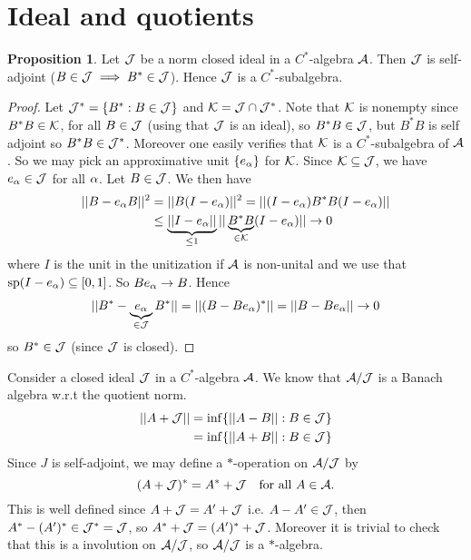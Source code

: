 \documentclass[10pt,english,a4paper]{article}
\theoremstyle{definition}
\newtheorem*{proposition}{Proposition}
\DeclareMathOperator{\Sp}{sp}
\begin{document}
\section{Ideal and quotients}
\begin{proposition}
    Let $\mathcal{J}$ be a norm closed ideal in a $C^*$-algebra $\mathcal{A}$. Then $\mathcal{J}$ is self-adjoint ($B \in \mathcal{J} \implies B^* \in \mathcal{J}$). 
Hence $\mathcal{J}$ is a $C^*$-subalgebra. 
\end{proposition}
\begin{proof}
    Let $\mathcal{J}^* = \{B^* : B \in \mathcal{J}\}$ and $\mathcal{K} = \mathcal{J}\cap \mathcal{J}^*$. Note that 
    $\mathcal{K}$ is nonempty since $B^*B \in \mathcal{K}$, for all $B\in \mathcal{J}$ (using that $\mathcal{J}$ is an ideal),
so $B^*B \in \mathcal{J}$, but $B^*B$ is self adjoint so $B^*B \in \mathcal{J}^*$.
Moreover one easily verifies that $\mathcal{K}$ is a $C^*$-subalgebra of $\mathcal{A}$.
So we may pick an approximative unit $\{e_{\alpha}\}$ for $\mathcal{K}$. Since 
$\mathcal{K} \subseteq \mathcal{J}$, we have $e_{\alpha} \in \mathcal{J}$ for all $\alpha$. Let 
$B \in \mathcal{J}$. We then have 
\begin{align*}
    ||B-e_{\alpha}B||^2 &=
    ||B(I-e_{\alpha})||^2 = ||(I-e_{\alpha}) B^*B (I - e_{\alpha})|| \\
    &\leq \underbrace{||I-e_{\alpha}||}_{\leq 1} ||\underbrace{B^*B}_{\in \mathcal{K}}(I-e_{\alpha})|| \to 0
\end{align*}
where $I$ is the unit in the unitization if $\mathcal{A}$ is non-unital and we use that 
$\Sp(I-e_{\al})\subseteq [0,1]$. So $Be_{\alpha} \to B$.
Hence
\begin{align*}
||B^* - \underbrace{e_{\alpha}}_{\in \mathcal{J}}B^* || = ||(B-Be_{\alpha})^* ||   = ||B-Be_{\alpha}|| \to 0 
\end{align*}
so $B^* \in \mathcal{J}$ (since $\mathcal{J}$ is closed).
\end{proof}


Consider a closed ideal $\mathcal{J}$ in a $C^*$-algebra $\mathcal{A}$. We know that $\mathcal{A}/\mathcal{J}$
is a Banach algebra w.r.t the quotient norm.
\begin{align*}
    ||A+\mathcal{J}|| &= \inf\{ ||A-B|| : B\in \mathcal{J} \} \\
              &= \inf\{ ||A+B|| : B\in \mathcal{J} \}
\end{align*}
Since $J$ is self-adjoint, we may define a $*$-operation on $\mathcal{A}/\mathcal{J}$ by
\[ (A + \mathcal{J})^* = A^* + \mathcal{J} \quad \text{for all } A \in \mathcal{A}.\]
This is well defined since 
$A +\mathcal{J} = A' + \mathcal{J}$ i.e. $A-A' \in \mathcal{J}$, then 
$A^* - (A')^* \in \mathcal{J}^* = \mathcal{J}$, so $A^* + \mathcal{J} = (A')^* + \mathcal{J}$.
Moreover it is trivial to check that this is a involution on 
$\mathcal{A}/\mathcal{J}$, so $\mathcal{A}/\mathcal{J}$ is a $*$-algebra.
\end{document}
